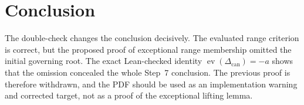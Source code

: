 \documentclass[11pt]{article}
\theoremstyle{definition}
\theoremstyle{remark}
\newcommand{\ev}{\operatorname{ev}}
\begin{document}
\section{Conclusion}

The double-check changes the conclusion decisively.  The evaluated range
criterion is correct, but the proposed proof of exceptional range membership
omitted the initial governing root.  The exact Lean-checked identity
\(\ev(\Delta_{\mathrm{can}})=-a\) shows that the omission concealed the
whole Step~7 conclusion.  The previous proof is therefore withdrawn, and
the PDF should be used as an implementation warning and corrected target,
not as a proof of the exceptional lifting lemma.
\end{document}
